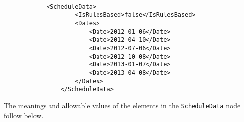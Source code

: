 \begin{lstlisting}[caption=ScheduleData with IsRulesBased: false, label=lst:schedule_data_false]

      		<ScheduleData>
                    <IsRulesBased>false</IsRulesBased>
                    <Dates>
                        <Date>2012-01-06</Date>
                        <Date>2012-04-10</Date>
                        <Date>2012-07-06</Date>
                        <Date>2012-10-08</Date>
                        <Date>2013-01-07</Date>
                        <Date>2013-04-08</Date>
                    </Dates>
                </ScheduleData>

\end{lstlisting}

The meanings and allowable values of the elements in the \lstinline!ScheduleData! node follow below.

